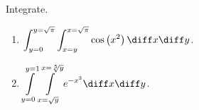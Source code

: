 Integrate.

\begin{enumerate}
\item  \label{problemint_(y=0)^(y=sqrt(pi))int_(x=0)^(x=y)cos x^2 dx dy} $\displaystyle \int_{ y=0}^{ y=\sqrt{\pi}} \int_{x=y }^{x = \sqrt{ \pi}} \cos \left( x^2 \right) \diff x\diff y$.

\item  \label{problemint_(y= 0)^(y=1)int_(x=sqrt y)^(x=y^(1/5)) e^(-x^3) dx xy} $\displaystyle \int \limits_{y= 0}^{y=1} \int \limits_{ x= \sqrt{y }}^{x=\sqrt[5]{y}} e^{-x^3}\diff x\diff y
$.

\end{enumerate}